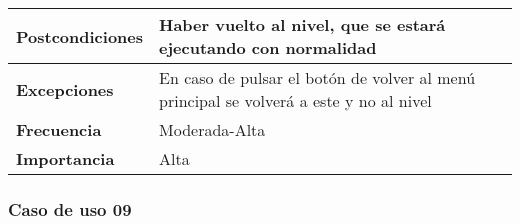 \begin{longtable}{l|l}
\begin{minipage}{0.25\columnwidth}
\textbf{Postcondiciones} 
\end{minipage}
&
\begin{minipage}{0.65\columnwidth}
Haber vuelto al nivel, que se estará ejecutando con normalidad
\end{minipage}
\\ \hline

\begin{minipage}{0.25\columnwidth}
\textbf{Excepciones} 
\end{minipage}
&
\begin{minipage}{0.65\columnwidth}
En caso de pulsar el botón de volver al menú principal se volverá a este y no al nivel
\end{minipage}
\\ \hline

\begin{minipage}{0.25\columnwidth}
\textbf{Frecuencia} 
\end{minipage}
&
\begin{minipage}{0.65\columnwidth}
Moderada-Alta
\end{minipage}
\\ \hline

\begin{minipage}{0.25\columnwidth}
\textbf{Importancia} 
\end{minipage}
&
\begin{minipage}{0.65\columnwidth}
Alta
\end{minipage}
\\ \hline
\end{longtable}

\subsubsection{Caso de uso 09}

